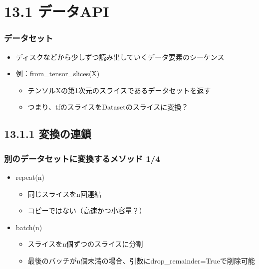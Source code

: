 \hypertarget{ux30c7ux30fcux30bfapi}{%
\section{13.1 データAPI}\label{ux30c7ux30fcux30bfapi}}

\hypertarget{ux30c7ux30fcux30bfux30bbux30c3ux30c8}{%
\subsubsection{データセット}\label{ux30c7ux30fcux30bfux30bbux30c3ux30c8}}

\begin{itemize}
\tightlist
\item
  ディスクなどから少しずつ読み出していくデータ要素のシーケンス
\item
  例：from\_tensor\_slices(X)

  \begin{itemize}
  \tightlist
  \item
    テンソルXの第1次元のスライスであるデータセットを返す
  \item
    つまり、tfのスライスをDatasetのスライスに変換？
  \end{itemize}
\end{itemize}

\hypertarget{ux5909ux63dbux306eux9023ux9396}{%
\subsection{13.1.1 変換の連鎖}\label{ux5909ux63dbux306eux9023ux9396}}

\hypertarget{ux5225ux306eux30c7ux30fcux30bfux30bbux30c3ux30c8ux306bux5909ux63dbux3059ux308bux30e1ux30bdux30c3ux30c9-14}{%
\subsubsection{別のデータセットに変換するメソッド
1/4}\label{ux5225ux306eux30c7ux30fcux30bfux30bbux30c3ux30c8ux306bux5909ux63dbux3059ux308bux30e1ux30bdux30c3ux30c9-14}}

\begin{itemize}
\tightlist
\item
  repeat(n)

  \begin{itemize}
  \tightlist
  \item
    同じスライスをn回連結
  \item
    コピーではない（高速かつ小容量？）
  \end{itemize}
\item
  batch(n)

  \begin{itemize}
  \tightlist
  \item
    スライスをn個ずつのスライスに分割
  \item
    最後のバッチがn個未満の場合、引数にdrop\_remainder=Trueで削除可能
  \end{itemize}
\end{itemize}


